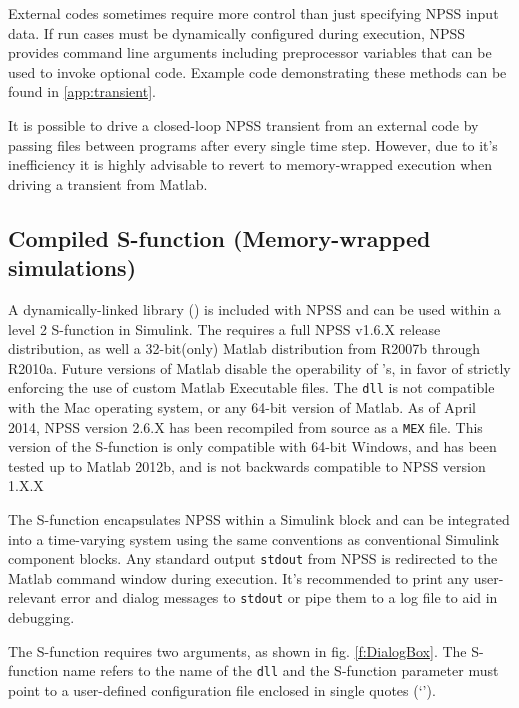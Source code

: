 \documentclass[heading.tex]{subfiles}
\begin{document}
External codes sometimes require more control than just specifying NPSS input data.
If run cases must be dynamically configured during execution,
NPSS provides command line arguments \cite[chap.~2.1]{NPSS}
including preprocessor variables that can be used to invoke optional code.
Example code demonstrating these methods can be found in \cref{app:transient}.

It is possible to drive a closed-loop NPSS transient from an external code
by passing files between programs after every single time step.
However, due to it's inefficiency it is highly advisable to revert to
memory-wrapped execution when driving a transient from Matlab.

\subsection{Compiled S-function (Memory-wrapped simulations)}

A dynamically-linked library () is included with NPSS
and can be used within a level 2 S-function in Simulink.
The  requires a full NPSS v1.6.X release distribution,
as well a 32-bit(only) Matlab distribution from R2007b through R2010a.
Future versions of Matlab disable the operability of 's,
in favor of strictly enforcing the use of custom Matlab Executable  files.
The \texttt{dll} is not compatible with the Mac operating system, or any 64-bit version
of Matlab. As of April 2014, NPSS version 2.6.X has been recompiled from source as a \texttt{MEX} file.
This version of the S-function is only compatible with 64-bit Windows, and has been tested up to Matlab 2012b,
and is not backwards compatible to NPSS version 1.X.X

The S-function encapsulates NPSS within a Simulink block and can be integrated into a time-varying
system using the same conventions as conventional Simulink component blocks.
Any standard output \texttt{stdout} from NPSS is redirected to the Matlab command window during execution. 
It's recommended to print any user-relevant error and dialog messages to \texttt{stdout}
or pipe them to a log file to aid in debugging.

The S-function requires two arguments, as shown in fig. \ref{f:DialogBox}.
The S-function name refers to the name of the \texttt{dll} and the S-function parameter must point
to a user-defined configuration file enclosed in single quotes (`').
\end{document}
